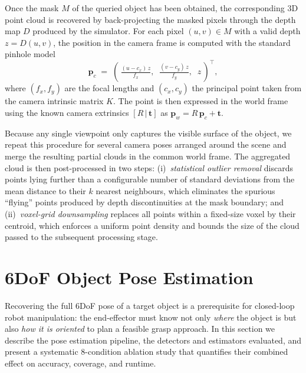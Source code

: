 \documentclass[conference,letterpaper,10pt]{IEEEtran}
\begin{document}
Once the mask $M$ of the queried object has been obtained, the
corresponding 3D point cloud is recovered by back-projecting the masked
pixels through the depth map $D$ produced by the simulator. For each
pixel $(u,v)\in M$ with a valid depth $z=D(u,v)$, the position in the
camera frame is computed with the standard pinhole model
\begin{equation}
\mathbf{p}_c \;=\; \left(\,\tfrac{(u-c_x)\,z}{f_x},\;\;
                          \tfrac{(v-c_y)\,z}{f_y},\;\; z\,\right)^{\!\top},
\label{eq:backproj}
\end{equation}
where $(f_x,f_y)$ are the focal lengths and $(c_x,c_y)$ the principal
point taken from the camera intrinsic matrix $K$. The point is then
expressed in the world frame using the known camera extrinsics
$[R\,|\,\mathbf{t}]$ as $\mathbf{p}_w = R\,\mathbf{p}_c + \mathbf{t}$.

Because any single viewpoint only captures the visible surface of the
object, we repeat this procedure for several camera poses arranged
around the scene and merge the resulting partial clouds in the common
world frame. The aggregated cloud is then post-processed in two steps:
(i)~\emph{statistical outlier removal} discards points lying further
than a configurable number of standard deviations from the mean
distance to their $k$ nearest neighbours, which eliminates the spurious
``flying'' points produced by depth discontinuities at the mask
boundary; and (ii)~\emph{voxel-grid downsampling} replaces all points
within a fixed-size voxel by their centroid, which enforces a uniform
point density and bounds the size of the cloud passed to the
subsequent processing stage.

\section{6DoF Object Pose Estimation}
\label{sec:pose}

Recovering the full 6DoF pose of a target object is a prerequisite for
closed-loop robot manipulation: the end-effector must know not only
\emph{where} the object is but also \emph{how it is oriented} to plan a
feasible grasp approach. In this section we describe the pose estimation
pipeline, the detectors and estimators evaluated, and present a
systematic 8-condition ablation study that quantifies their
combined effect on accuracy, coverage, and runtime.
\end{document}
